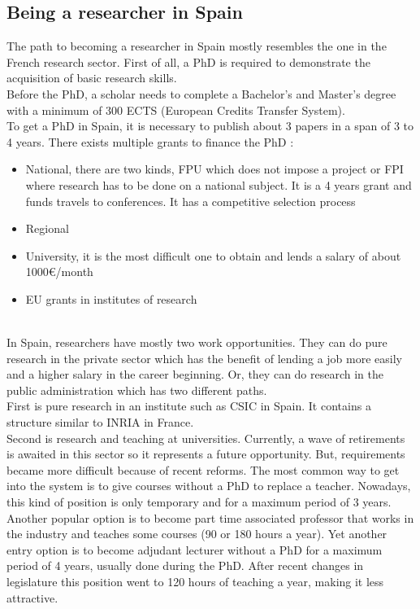 \documentclass{article}
\begin{document}
\subsection{Being a researcher in Spain}
The path to becoming a researcher in Spain mostly resembles the one in the French research sector.
First of all, a PhD is required to demonstrate the acquisition of basic research skills.
\\
Before the PhD, a scholar needs to complete a Bachelor’s and Master’s degree with a minimum of 300 ECTS (European Credits Transfer System).
\\
To get a PhD in Spain, it is necessary to publish about  3 papers in a span of 3 to 4 years.
There exists multiple grants to finance the PhD :
\begin{itemize}
\item National, there are two kinds, FPU which does not impose a project or FPI where research has to be done on a national subject. It is a 4 years grant and funds travels to conferences. It has a competitive selection process
\item Regional
\item University, it is the most difficult one to obtain and lends a salary of about 1000€/month
\item EU grants in institutes of research
\end{itemize}
\\
In Spain, researchers have mostly two work opportunities. They can do pure research in the private sector which has the benefit of lending a job more easily and a higher salary in the career beginning.
Or, they can do research in the public administration which has two different paths.
\\
First is pure research in an institute such as CSIC in Spain. It contains a structure similar to INRIA in France.
\\
Second is research and teaching at universities. Currently, a wave of retirements is awaited in this sector so it represents a future opportunity. But, requirements became more difficult because of recent reforms.
The most common way to get into the system is to give courses without a PhD to replace a teacher. Nowadays, this kind of position is only temporary and for a maximum period of 3 years.
\\
Another popular option is to become part time associated professor that works in the industry and teaches some courses (90 or 180 hours a year).
Yet another entry option is to become adjudant lecturer without a PhD for a maximum period of 4 years, usually done during the PhD. After recent changes in legislature this position went to 120 hours of teaching a year, making it less attractive.
\end{document}
